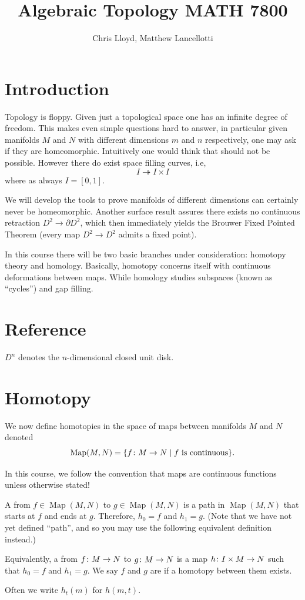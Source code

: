 \documentclass[11pt,leqno,oneside]{amsart}
\title[Algebraic Topology]{Algebraic Topology MATH 7800}
\author{Chris Lloyd, Matthew Lancellotti}
\date{}
\newenvironment{dateenv}{
  \vspace{1em}
}{
  \vspace{1em}
}
\newcommand{\mydate}[4]{
  \newdate{#1}{#2}{#3}{#4}
  \begin{dateenv}
    \hfill\displaydate{#1}
  \end{dateenv}
}
\numberwithin{thm}{section}
\renewcommand{\d}{\partial}
\newcommand{\x}{\times}
\newcommand{\Map}{\operatorname{Map}}
\begin{document}
\maketitle \newpage

\mydate{d1}{18}{1}{2017}

\section{Introduction}

Topology is floppy. Given just a topological space one has an infinite
degree of freedom. This makes even simple questions hard to answer, in
particular given manifolds \(M\) and \(N\) with different dimensions
\(m\) and \(n\) respectively, one may ask if they are
homeomorphic. Intuitively one would think that should not be
possible. However there do exist space filling curves, i.e,
\[I \twoheadrightarrow I \times I\]
where as always \(I=[0,1]\).

We will develop the tools to prove manifolds of different dimensions can
certainly never be homeomorphic. Another surface result assures there exists no continuous
retraction \(D^2 \to \d D^2\), which then immediately yields the
Brouwer Fixed Pointed Theorem (every map \(D^2 \to D^2\) admits a
fixed point).

In this course there will be two basic branches under consideration:
homotopy theory and homology. Basically, homotopy concerns itself with
continuous deformations between maps. While homology studies subspaces
(known as ``cycles'') and gap filling.

\section{Reference}
%
\begin{defn}
  $D^n$ denotes the $n$-dimensional closed unit disk.
\end{defn}

\section{Homotopy}

We now define homotopies in the space of maps between manifolds \(M\)
and \(N\) denoted
\[\Map(M,N)=\{f \from M \to N \suchthat \text{$f$ is continuous}\}.\]

In this course, we follow the convention that maps are continuous
functions unless otherwise stated!

\begin{defn}
  A  from \(f \in \Map(M, N)\) to \(g \in \Map(M, N)\) is a path in $\Map(M, N)$ that starts at $f$ and ends at $g$.  Therefore, $h_0 = f$ and $h_1 = g$.  (Note that we have not yet defined ``path'', and so you may use the following equivalent definition instead.)

  Equivalently, a  from \(f \colon M \to N\) to \(g \colon M \to N\)
  is a map \(h\from I \x M \to N\) such that \(h_0=f\) and \(h_1=g\). We say \(f\) and
  \(g\) are  if a homotopy between them exists.

  Often we write \(h_t(m)\) for \(h(m,t)\).
\end{defn}
\end{document}
